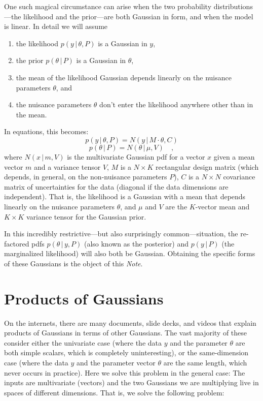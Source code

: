 \documentclass[12pt, letterpaper]{article}
\newcommand{\documentname}{\textsl{Note}}
\newcommand{\given}{\,|\,}
\begin{document}
One such magical circumstance can arise when the two probability
distributions---the likelihood and the prior---are both Gaussian in
form, and when the model is linear.
In detail we will assume
\begin{enumerate}
\item
the likelihood $p(y\given\theta, P)$ is a Gaussian in $y$,
\item
the prior $p(\theta\given P)$ is a Gaussian in $\theta$,
\item
the mean of the likelihood Gaussian depends linearly on the nuisance
parameters $\theta$, and
\item
the nuisance parameters $\theta$ don't enter the likelihood anywhere
other than in the mean.
\end{enumerate}
In equations, this becomes:
\begin{equation}
p(y\given\theta, P) = N(y\given M\cdot\theta, C)
\end{equation}
\begin{equation}
p(\theta\given P) = N(\theta\given \mu, V)
\quad ,
\end{equation}
where
$N(x\given m,V)$ is the multivariate Gaussian pdf for a vector $x$
given a mean vector $m$ and a variance tensor $V$,
$M$ is a $N\times K$ rectangular design matrix (which depends, in
general, on the non-nuisance parameters $P$),
$C$ is a $N\times N$ covariance matrix of uncertainties for the
data (diagonal if the data dimensions are independent).
That is, the likelihood is a Gaussian with a mean that depends
linearly on the nuisance parameters $\theta$, and
$\mu$ and $V$ are the $K$-vector mean and $K\times K$ variance tensor
for the Gaussian prior.

In this incredibly restrictive---but also surprisingly
common---situation, the re-factored pdfs $p(\theta\given y, P)$ (also
known as the posterior) and $p(y\given P)$ (the marginalized
likelihood) will also both be Gaussian.
Obtaining the specific forms of these Gaussians is the object of this
\documentname.

\section{Products of Gaussians}

On the internets, there are many documents, slide decks, and videos
that explain products of Gaussians in terms of other Gaussians.
The vast majority of these consider either the univariate case (where
the data $y$ and the parameter $\theta$ are both simple scalars, which
is completely uninteresting), or the same-dimension case (where the data
$y$ and the parameter vector $\theta$ are the same length, which never
occurs in practice).
Here we solve this problem in the general case:
The inputs are multivariate (vectors) and the two Gaussians we are
multiplying live in spaces of different dimensions.
That is, we solve the following problem:
\end{document}
